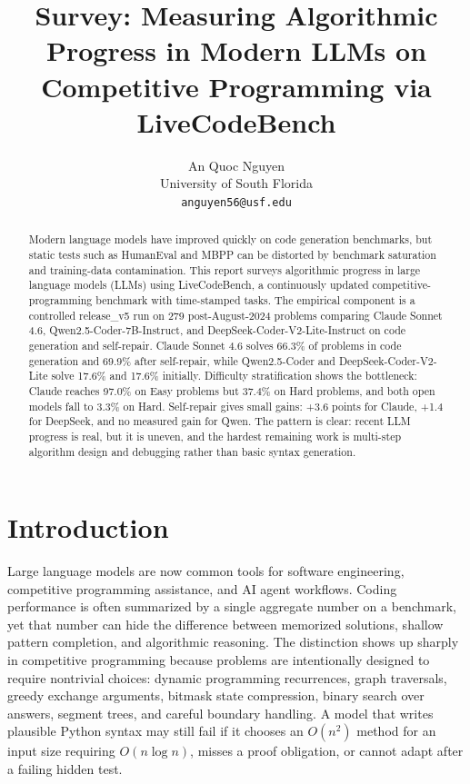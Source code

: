 \documentclass[11pt]{article}
\title{Survey: Measuring Algorithmic Progress in Modern LLMs on Competitive Programming via LiveCodeBench}
\author{An Quoc Nguyen \\
  University of South Florida \\
  \texttt{anguyen56@usf.edu}}
\newcommand{\lcb}{LiveCodeBench}
\begin{document}
\maketitle
\begin{abstract}
Modern language models have improved quickly on code generation benchmarks, but static tests such as HumanEval and MBPP can be distorted by benchmark saturation and training-data contamination. This report surveys algorithmic progress in large language models (LLMs) using \lcb{}, a continuously updated competitive-programming benchmark with time-stamped tasks. The empirical component is a controlled release\_v5 run on 279 post-August-2024 problems comparing Claude Sonnet 4.6, Qwen2.5-Coder-7B-Instruct, and DeepSeek-Coder-V2-Lite-Instruct on code generation and self-repair. Claude Sonnet 4.6 solves 66.3\% of problems in code generation and 69.9\% after self-repair, while Qwen2.5-Coder and DeepSeek-Coder-V2-Lite solve 17.6\% and 17.6\% initially. Difficulty stratification shows the bottleneck: Claude reaches 97.0\% on Easy problems but 37.4\% on Hard problems, and both open models fall to 3.3\% on Hard. Self-repair gives small gains: +3.6 points for Claude, +1.4 for DeepSeek, and no measured gain for Qwen. The pattern is clear: recent LLM progress is real, but it is uneven, and the hardest remaining work is multi-step algorithm design and debugging rather than basic syntax generation.
\end{abstract}

\section{Introduction}
Large language models are now common tools for software engineering, competitive programming assistance, and AI agent workflows. Coding performance is often summarized by a single aggregate number on a benchmark, yet that number can hide the difference between memorized solutions, shallow pattern completion, and algorithmic reasoning. The distinction shows up sharply in competitive programming because problems are intentionally designed to require nontrivial choices: dynamic programming recurrences, graph traversals, greedy exchange arguments, bitmask state compression, binary search over answers, segment trees, and careful boundary handling. A model that writes plausible Python syntax may still fail if it chooses an $O(n^2)$ method for an input size requiring $O(n \log n)$, misses a proof obligation, or cannot adapt after a failing hidden test.
\end{document}
